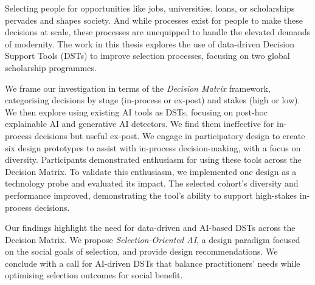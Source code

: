 Selecting people for opportunities like jobs, universities, loans, or scholarships pervades and shapes society. And while processes exist for people to make these decisions at scale, these processes are unequipped to handle the elevated demands of modernity. The work in this thesis explores the use of data-driven Decision Support Tools (DSTs) to improve selection processes, focusing on two global scholarship programmes.

We frame our investigation in terms of the \emph{Decision Matrix} framework, categorising decisions by stage (in-process or ex-post) and stakes (high or low). We then explore using existing AI tools as DSTs, focusing on post-hoc explainable AI and generative AI detectors. We find them ineffective for in-process decisions but useful ex-post. We engage in participatory design to create six design prototypes to assist with in-process decision-making, with a focus on diversity. Participants demonstrated enthusiasm for using these tools across the Decision Matrix. To validate this enthusiasm, we implemented one design as a technology probe and evaluated its impact. The selected cohort's diversity and performance improved, demonstrating the tool's ability to support high-stakes in-process decisions. 

Our findings highlight the need for data-driven and AI-based DSTs across the Decision Matrix. We propose \emph{Selection-Oriented AI}, a design paradigm focused on the social goals of selection, and provide design recommendations. We conclude with a call for AI-driven DSTs that balance practitioners' needs while optimising selection outcomes for social benefit.